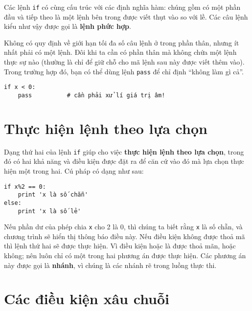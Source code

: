 \documentclass[11pt]{book}
\begin{document}
Các lệnh {\tt if} có cùng cấu trúc với các định nghĩa hàm: chúng
gồm có một phần đầu và tiếp theo là một lệnh bên trong được
viết thụt vào so với lề. Các câu lệnh kiểu như vậy được gọi là 
{\bf lệnh phức hợp}.

Không có quy định về giới hạn tối đa số câu lệnh ở trong phần thân,
nhưng ít nhất phải có một lệnh. Đôi khi ta cần có phần thân mà không
chứa một lệnh thực sự nào (thường là chỉ để giữ chỗ cho mã lệnh sau
này được viết thêm vào). Trong trường hợp đó, bạn có thể dùng lệnh
{\tt pass} để chỉ định ``không làm gì cả''.


\beforeverb
\begin{verbatim}
if x < 0:
    pass          # cần phải xử lí giá trị âm!
\end{verbatim}
\afterverb
%

\section{Thực hiện lệnh theo lựa chọn}
\label{alternative execution}


Dạng thứ hai của lệnh {\tt if} giúp cho việc {\bf thực hiện lệnh theo lựa chọn},
trong đó có hai khả năng và điều kiện được đặt ra để căn cứ vào
đó mà lựa chọn thực hiện một trong hai. Cú pháp có dạng như sau:

\beforeverb
\begin{verbatim}
if x%2 == 0:
    print 'x là số chẵn'
else:
    print 'x là số lẻ'
\end{verbatim}
\afterverb
%
Nếu phần dư của phép chia {\tt x} cho 2 là 0, thì chúng ta biết rằng 
{\tt x} là số chẵn, và chương trình sẽ hiển thị thông báo điều này.
Nếu điều kiện không được thoả mã thì lệnh thứ hai sẽ được thực hiện.
Vì điều kiện hoặc là được thoả mãn, hoặc không; nên luôn chỉ
có một trong hai phương án được thực hiện. Các phương án này được 
gọi là {\bf nhánh}, vì chúng là các nhánh rẽ trong luồng thực thi.




\section{Các điều kiện xâu chuỗi}
\end{document}
